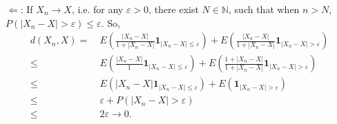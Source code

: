 \documentclass[en, normal, 11pt, black]{elegantnote}
\newenvironment{exercise}[1]{\begin{tcolorbox}[colback=black!15, colframe=black!80, breakable, title=#1]}{\end{tcolorbox}}
\newenvironment{solution}{\begin{tcolorbox}[colback=white, colframe=black!50, breakable, title=Solution. ]\setlength{\parskip}{0.8em}}{\end{tcolorbox}}
\begin{document}
\begin{solution}
        $\Longleftarrow$: If $X_n\to X$, i.e. for any $\varepsilon>0$, there exist $N\in\mathbb{N}$, such that when $n>N$, $P\left(|X_n-X|>\varepsilon\right)\leqslant\varepsilon$. So, 
        \[
            \begin{aligned}
                d(X_n, X)=&\ E\left(\frac{|X_n-X|}{1+|X_n-X|}\mathbf{1}_{|X_n-X|\leqslant\varepsilon}\right)+E\left(\frac{|X_n-X|}{1+|X_n-X|}\mathbf{1}_{|X_n-X|>\varepsilon}\right)\\
                \leqslant&\ E\left(\frac{|X_n-X|}{1}\mathbf{1}_{|X_n-X|\leqslant\varepsilon}\right)+E\left(\frac{1+|X_n-X|}{1+|X_n-X|}\mathbf{1}_{|X_n-X|>\varepsilon}\right)\\
                \leqslant&\ E(|X_n-X|\mathbf{1}_{|X_n-X|\leqslant\varepsilon})+E\left(\mathbf{1}_{|X_n-X|>\varepsilon}\right)\\
                \leqslant&\ \varepsilon+P(|X_n-X|>\varepsilon)\\
                \leqslant&\ 2\varepsilon\to0. 
            \end{aligned}
        \]
    \end{solution}


        
        
\end{document}
